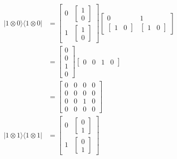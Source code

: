\documentclass[main.tex]{subfiles}
\begin{document}
\begin{enumerate}
\begin{enumerate}
\begin{align*}
            |1 \otimes 0\rangle\langle 1 \otimes 0| & = \left[\begin{array}{ll} 0 & {\left[\begin{array}{l} 1 \\ 0 \end{array}\right]} \\
                                                    1 & {\left[\begin{array}{l} 1 \\ 0 \end{array}\right]} \end{array}\right]
                                                    \left[\begin{array}{ll} 0 & 1 \\
                                                    {\left[\begin{array}{ll} 1 & 0 \end{array}\right]} & 
                                                    {\left[\begin{array}{ll} 1 & 0 \end{array}\right]} \end{array}\right]\\
                                                    & = \left[\begin{array}{l} 0 \\ 0 \\ 1 \\ 0 \end{array}\right]
                                                    \left[\begin{array}{llll} 0 & 0 & 1 & 0 \end{array}\right]\\
                                                    & = \left[\begin{array}{llll} 0&0&0&0\\0&0&0&0\\0&0&1&0\\0&0&0&0\end{array}\right]\\
            |1 \otimes 1\rangle\langle 1 \otimes 1| & = \left[\begin{array}{ll} 0 & {\left[\begin{array}{l} 0 \\ 1 \end{array}\right]} \\
                                                    1 & {\left[\begin{array}{l} 0 \\ 1 \end{array}\right]} \end{array}\right]

\end{align*}
\end{enumerate}
\end{enumerate}
\end{document}
